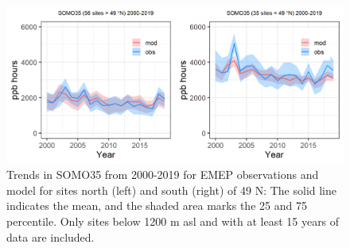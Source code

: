 \begin{figure}
	\centering
	\includegraphics[width=0.74\paperwidth]{FIGS_TRENDS/SOMO35_2000_2019_1200m.png}
	\caption{\label{fig:O3_somo35trends}Trends in SOMO35 from 2000-2019 for EMEP observations and model for sites north (left) and south (right) of 49 N: The solid line indicates the mean, and the shaded area marks the 25 and 75 percentile. Only sites below 1200 m asl and with at least 15 years of data are included.}
\end{figure}


\clearpage
\renewcommand\bibname{References}      %

